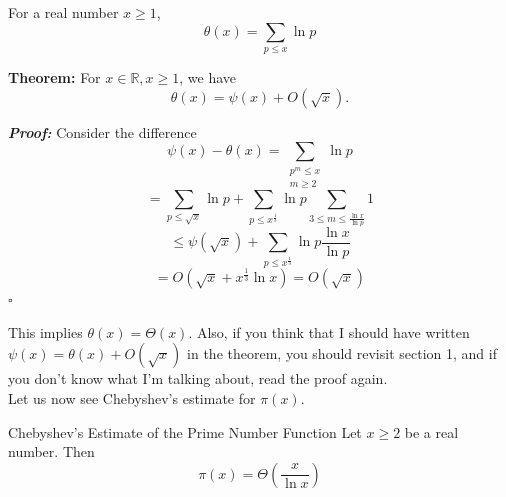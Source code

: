 \documentclass[a4paper,11pt,abstracton]{scrartcl}
\newcommand{\RR}{\mathbb{R}}
\theoremstyle{dotlessP}
\theoremstyle{dotlessS}
\theoremstyle{remark}
\theoremstyle{definition}
\begin{document}
\begin{definition_box}
For a real number $x \ge 1$,
$$\theta(x) = \sum_{p \le x}\ln p$$
\end{definition_box}


\begin{problem_box}
\textbf{Theorem:} For $x \in \RR, x \ge 1$, we have
\[\theta(x) = \psi(x) + O(\sqrt{x}).\]
\end{problem_box}

\begin{claim_box}
\textbf{\textit{Proof:}}
Consider the difference
$$\psi(x)-\theta(x) = \sum_{\substack{p^m \le x \\ m \ge 2}}\ln p$$
$$=\sum_{p \le \sqrt{x}}\ln p + \sum_{p \le x^{\frac{1}{3}}}\ln p \sum_{3 \le m \le \frac{\ln x}{\ln p}}1$$
$$\le \psi(\sqrt{x})+\sum_{p \le x^{\frac{1}{3}}}\ln p \frac{\ln x}{\ln p}$$
$$=O(\sqrt{x}+x^{\frac{1}{3}}\ln x) = O(\sqrt{x})$$
\hfill$\square$
\end{claim_box}

This implies $\theta(x)=\Theta(x)$. Also, if you think that I should have written $\psi(x)=\theta(x) + O(\sqrt{x})$ in the theorem, you should revisit section 1, and if you don't know what I'm talking about, read the proof again.
\\Let us now see Chebyshev's estimate for $\pi(x)$.

\begin{mainbox}{Chebyshev's Estimate of the Prime Number Function}
Let $x\ge 2$ be a real number. Then
$$\pi(x)=\Theta\!\left(\frac{x}{\ln x}\right)$$
\end{mainbox}
\end{document}
